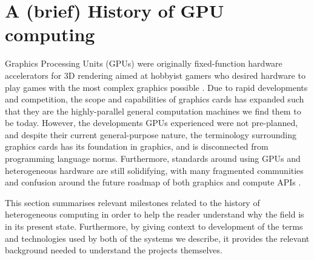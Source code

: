 \documentclass[a4paper,12pt,twoside,openright]{report}
\begin{document}



\section{A (brief) History of GPU computing}

\label{sec:history_gpu}

Graphics Processing Units (GPUs) were originally fixed-function hardware
accelerators for 3D rendering aimed at hobbyist gamers who desired hardware to
play games with the most complex graphics possible \cite{GLQuake}. Due to rapid
developments and competition, the scope and capabilities of graphics cards has
expanded such that they are the highly-parallel general computation machines we
find them to be today. However, the developments GPUs experienced were not
pre-planned, and despite their current general-purpose nature, the terminology
surrounding graphics cards has its foundation in graphics, and is disconnected
from programming language norms. Furthermore, standards around using GPUs and
heterogeneous hardware are still solidifying, with many fragmented communities
and confusion around the future roadmap of both graphics and compute APIs
\cite{TODO}.

This section summarises relevant milestones related to the history of
heterogeneous computing in order to help the reader understand why the field is
in its present state. Furthermore, by giving context to development of the
terms and technologies used by both of the systems we describe, it provides the
relevant background needed to understand the projects themselves.

\end{document}
